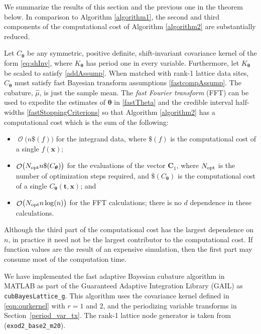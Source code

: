 \documentclass{svjour3}                     %
\DeclareMathOperator{\Order}{{\mathcal O}}
\newcommand{\bm}[1]{\boldsymbol{#1}}
\newcommand{\vtheta}{{\bm{\theta}}}
\newcommand{\vC}{\bm{C}}
\newcommand{\vt}{\bm{t}}
\newcommand{\vx}{\bm{x}}
\newcommand{\opt}{{\textup{opt}}}
\newcommand{\hmu}{\widehat{\mu}}
\newcommand{\code}[1]{\texttt{#1}}
\newcommand\secref{Section~\ref}
\begin{document}
We summarize the results of this section and the previous one in the theorem below.  In comparison to Algorithm \ref{algorithm1}, the second and third components of the computational cost of Algorithm  \ref{algorithm2} are substantially reduced.
\begin{theorem}
Let $C_\vtheta$ be any symmetric, positive definite,  shift-invariant covariance kernel of the form \eqref{eq:shInv}, where $K_\vtheta$ has period one in every variable.  Furthermore, let $K_\vtheta$ be scaled to satisfy \eqref{addAssump}.  When matched with rank-1 lattice data sites, $C_\vtheta$ must satisfy fast Bayesian transform assumptions \eqref{fastcompAssump}.  The cubature, $\hmu$, is just the sample mean.  The \emph{fast Fourier transform} (FFT) can be used to expedite the estimates of $\vtheta$ in \eqref{fastTheta} and the credible interval half-widths \eqref{fastStoppingCriterions} so that Algorithm \ref{algorithm2} has a computational cost which is the sum of the following:
\begin{itemize}
	\item $\Order\bigl(n\$(f) \bigr)$ for the integrand data, where $\$(f)$ is the computational cost of a single $f(\vx)$;
	
	\item $\Order\bigl(N_{\opt} n \$(C_\vtheta) \bigr)$ for the evaluations of the vector $\vC_{1}$, where $N_\opt$ is the number of optimization steps required, and  $\$(C_\vtheta)$ is the computational cost of a single $C_\vtheta(\vt,\vx)$; and
	
	\item $\Order\bigl(N_{\opt} n \log(n) \bigr)$ for the FFT calculations; there is no $d$ dependence in these calculations.
	
\end{itemize}

\end{theorem}

Although the third part of the computational cost has the largest dependence on $n$, in practice it need not be the largest contributor to the computational cost.  If function values are the result of an expensive simulation, then the first part may consume most of the computation time.

We have implemented the fast adaptive Bayesian cubature algorithm in MATLAB as part of the Guaranteed Adaptive Integration Library (GAIL) \citep{ChoEtal19a} as \code{cubBayesLattice\_g}. This algorithm uses the covariance kernel defined in \eqref{eqn:ourkernel} with  $r=1$ and $2$, and the periodizing variable transforms in  \secref{period_var_tx}.  The rank-1 lattice node generator is taken from \cite{Nuy17a}  (\code{exod2\_base2\_m20}).
\end{document}
